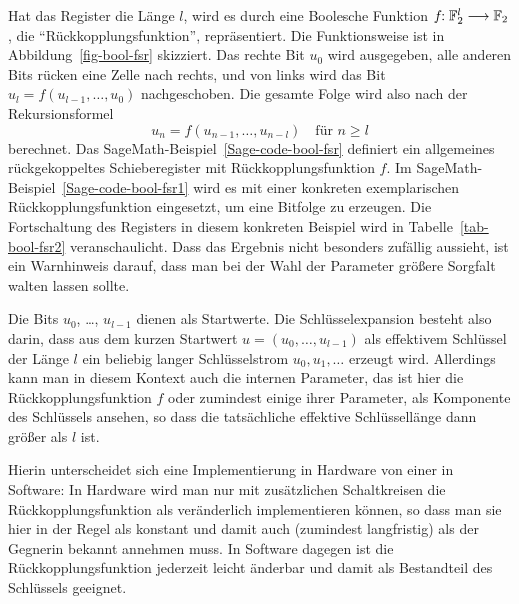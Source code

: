 \begin{refsegment}
Hat das Register die Länge $l$, wird es durch eine
Boolesche Funktion
$f\!\!: \mathbb{F}_2^l \longrightarrow \mathbb{F}_2$, die
"`Rückkopplungsfunktion"',
repräsentiert. Die Funktionsweise
ist in Abbildung~\ref{fig-bool-fsr} skizziert. Das rechte Bit $u_0$
wird ausgegeben, alle anderen Bits rücken eine Zelle nach rechts,
und von links wird das Bit $u_l = f(u_{l-1}, \ldots, u_0)$ nachgeschoben.
Die gesamte Folge wird also nach der Rekursionsformel
\begin{equation}\label{eq-bool-fsr}
     u_n = f(u_{n-1}, \ldots, u_{n-l}) \quad \text{für } n \geq l
\end{equation}
berechnet. Das SageMath-Beispiel~\ref{Sage-code-bool-fsr} definiert ein
allgemeines rückgekoppeltes Schieberegister mit Rückkopplungsfunktion
$f$. Im SageMath-Beispiel~\ref{Sage-code-bool-fsr1} wird es mit einer
konkreten exemplarischen Rückkopplungsfunktion eingesetzt,
um eine Bitfolge zu erzeugen. Die Fortschaltung des Registers
in diesem konkreten Beispiel wird
in Tabelle~\ref{tab-bool-fsr2} veranschaulicht. Dass das Ergebnis nicht
besonders zufällig aussieht, ist ein Warnhinweis darauf, dass man
bei der Wahl der Parameter größere Sorgfalt walten lassen sollte.

Die Bits $u_0$, \ldots, $u_{l-1}$ dienen als Startwerte.
Die Schlüsselexpansion besteht also darin, dass aus dem kurzen
Startwert $u = (u_0, \ldots, u_{l-1})$ als effektivem Schlüssel der
Länge $l$ ein beliebig langer Schlüsselstrom $u_0, u_1, \ldots$
erzeugt wird. Allerdings kann man in diesem Kontext auch die
internen Parameter, das ist hier die Rückkopplungsfunktion $f$
oder zumindest einige ihrer Parameter,
als Komponente des Schlüssels ansehen, so dass die tatsächliche
effektive Schlüssellänge dann größer als $l$ ist.

Hierin unterscheidet sich eine Implementierung in Hardware von
einer in Software: In Hardware wird man nur mit zusätzlichen
Schaltkreisen die Rückkopplungsfunktion
als veränderlich
implementieren können, so dass man sie hier in der Regel als
konstant und damit auch (zumindest langfristig) als der Gegnerin
bekannt annehmen muss. In Software dagegen ist die Rückkopplungsfunktion
jederzeit leicht änderbar und damit als Bestandteil des Schlüssels
geeignet.


\end{refsegment}
